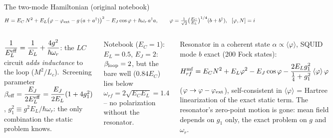 \documentclass[aspectratio=169,9pt]{beamer}
\begin{document}
\begin{frame}{The two-mode Hamiltonian (original notebook)}
  \vspace{-1mm}
  {\small\[
    H=E_C\,N^2+E_L\big(\varphi-\varphi_{\rm ext}-g\,(a+a^\dagger)\big)^2-E_J\cos\varphi+\hbar\omega_r\,a^\dagger a,
    \qquad \varphi=\tfrac{1}{\sqrt2}\big(\tfrac{E_C}{E_L}\big)^{1/4}(b+b^\dagger),\ \ [\varphi,N]=i
  \]}
  \vspace{-4mm}
  \begin{columns}[T]
    \begin{keybox}[title={Resonator seen statically (minimize over $a+a^\dagger$)}]
      \footnotesize $\dfrac{1}{E_L^{\rm eff}}=\dfrac{1}{E_L}+\dfrac{4g^2}{\hbar\omega_r}$: the $LC$ circuit \emph{adds inductance}
      to the loop ($M^2/L_c$).\ Screening parameter
      $\beta_{\rm eff}=\dfrac{E_J}{2E_L^{\rm eff}}=\dfrac{E_J}{2E_L}(1+4g_1^2)$, $g_1^2\equiv g^2E_L/\hbar\omega_r$:
      the only combination the static problem knows.
    \end{keybox}
    \footnotesize Notebook ($E_C=1$): $E_L=0.5$, $E_J=2$: $\beta_{\rm loop}=2$, but the bare well ($0.84E_C$) lies below
    $\omega_{rf}=2\sqrt{E_CE_L}=1.4$ -- no polarization without the resonator.
    \begin{keybox}[title={Mean field of the notebook: $|{\rm GS}\rangle=|\psi_{rf}\rangle|\psi_{ph}\rangle$}]
      \footnotesize Resonator in a coherent state $\alpha\propto\langle\varphi\rangle$, SQUID mode $b$ exact (200 Fock states):
      \[
        H^{\rm mf}_{rf}=E_CN^2+E_L\varphi^2-E_J\cos\varphi-\frac{2E_Lg_1^2}{\tfrac14+g_1^2}\,\langle\varphi\rangle\,\varphi
      \]
      ($\varphi\to\varphi-\varphi_{\rm ext}$), self-consistent in $\langle\varphi\rangle$ = Hartree linearization of the exact
      static term. The resonator's zero-point motion is gone: mean field depends on $g_1$ only, the exact problem on $g$ and $\omega_r$.
    \end{keybox}
  \end{columns}
\end{frame}
\end{document}
